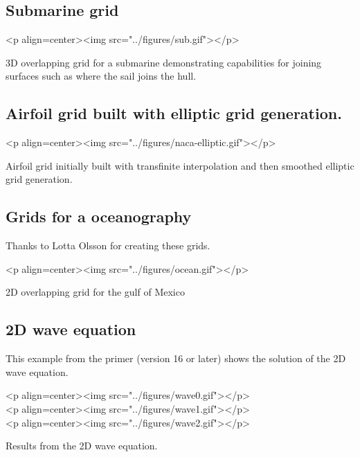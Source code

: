 \documentclass{article}
\begin{document}
\subsection{Submarine grid}

\begin{rawhtml}
<p align=center><img src="../figures/sub.gif"></p>
\end{rawhtml}
\begin{flushleft}
{\LARGE 3D overlapping grid for a submarine demonstrating capabilities
   for joining surfaces such as where the sail joins the hull.} 
\end{flushleft}

\subsection{Airfoil grid built with elliptic grid generation.}

\begin{rawhtml}
<p align=center><img src="../figures/naca-elliptic.gif"></p>
\end{rawhtml}
\begin{flushleft}
{\LARGE Airfoil grid initially built with transfinite interpolation and
   then smoothed elliptic grid generation.} 
\end{flushleft}


\subsection{Grids for a oceanography}

Thanks to Lotta Olsson for creating these grids.


\begin{rawhtml}
<p align=center><img src="../figures/ocean.gif"></p>
\end{rawhtml}
\begin{flushleft}
{\LARGE 2D overlapping grid for the gulf of Mexico} 
\end{flushleft}

\subsection{2D wave equation}

This example from the primer (version 16 or later)
shows the solution of the 2D wave equation.

\begin{rawhtml}
<p align=center><img src="../figures/wave0.gif"></p> \\
<p align=center><img src="../figures/wave1.gif"></p>  \\
<p align=center><img src="../figures/wave2.gif"></p>
\end{rawhtml}
\begin{flushleft}
{\LARGE Results from the 2D wave equation.}
\end{flushleft}
\end{document}
